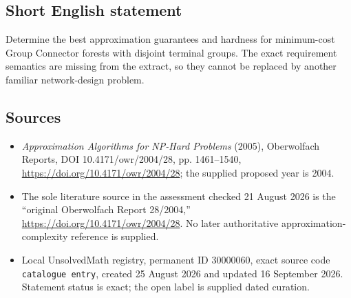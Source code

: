 \documentclass[11pt]{article}
\begin{document}
\subsection{Short English statement}
Determine the best approximation guarantees and hardness for minimum-cost Group Connector forests with disjoint terminal groups. The exact requirement semantics are missing from the extract, so they cannot be replaced by another familiar network-design problem.
\subsection{Sources}
\begin{itemize}
\item \emph{Approximation Algorithms for NP-Hard Problems} (2005), Oberwolfach Reports, DOI 10.4171/owr/2004/28, pp. 1461--1540, \url{https://doi.org/10.4171/owr/2004/28}; the supplied proposed year is 2004.
\item The sole literature source in the assessment checked 21 August 2026 is the ``original Oberwolfach Report 28/2004,'' \url{https://doi.org/10.4171/owr/2004/28}. No later authoritative approximation-complexity reference is supplied.
\item Local UnsolvedMath registry, permanent ID $30000060$, exact source code \texttt{catalogue entry}, created 25 August 2026 and updated 16 September 2026. Statement status is exact; the open label is supplied dated curation.
\end{itemize}
\end{document}
